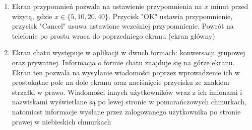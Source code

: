 \documentclass[12pt]{article}
\begin{document}
\begin {enumerate}
	\item Ekran przypomnień pozwala na ustawienie przypomnienia na $x$ minut przed wizytą, gdzie $x\in\{5, 10, 20, 40\}$. Przycisk "OK" ustawia przypomnienie, przycisk "Cancel" usuwa ustawione wcześniej przypomnienie. Powrót na telefonie po prostu wraca do poprzedniego ekranu (ekran główny)
	
	\item Ekran chatu występuje w aplikacji w dwuch formach: konwersacji grupowej oraz prywatnej. Informacja o formie chatu znajduje się na górze ekranu. Ekran ten pozwala na wysyłanie wiadomości poprzez wprowadzenie ich w prostokątne pole na dole ekranu oraz naciśnięcie przycisku ze znakiem strzałki w prawo. Wiadomości innych użytkowników wraz z ich imionami i nazwiskami wyświetlane są po lewej stronie w pomarańczowych chmurkach, natomiast informacje wysłane przez zalogowanego użytkownika po stronie prawej w niebieskich chmurkach
	
\end{enumerate}


\clearpage
\end{document}

